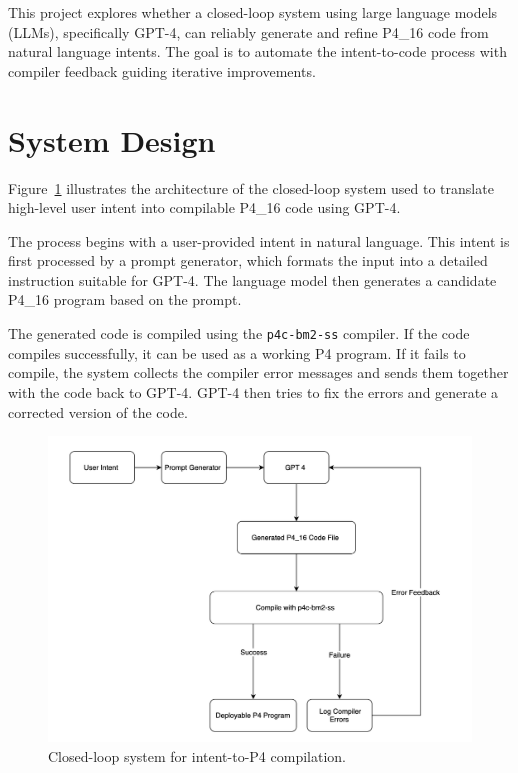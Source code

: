 \documentclass[sigconf]{acmart}
\begin{document}
This project explores whether a closed-loop system using large language models (LLMs), specifically GPT-4, can reliably generate and refine P4\_16 code from natural language intents. The goal is to automate the intent-to-code process with compiler feedback guiding iterative improvements.



\section{System Design}

Figure~\ref{fig:system-design}  illustrates the architecture of the closed-loop system used to translate high-level user intent into compilable P4\_16 code using GPT-4. 

The process begins with a user-provided intent in natural language. This intent is first processed by a prompt generator, which formats the input into a detailed instruction suitable for GPT-4. The language model then generates a candidate P4\_16 program based on the prompt.

The generated code is compiled using the \texttt{p4c-bm2-ss} compiler. If the code compiles successfully, it can be used as a working P4 program. If it fails to compile, the system collects the compiler error messages and sends them together with the code back to GPT-4. GPT-4 then tries to fix the errors and generate a corrected version of the code.


\begin{figure}[t]
    \centering
    \includegraphics[width=\linewidth]{feedback_loop.png}
    \caption{Closed-loop system for intent-to-P4 compilation.}
    \label{fig:system-design}
\end{figure}
\end{document}
